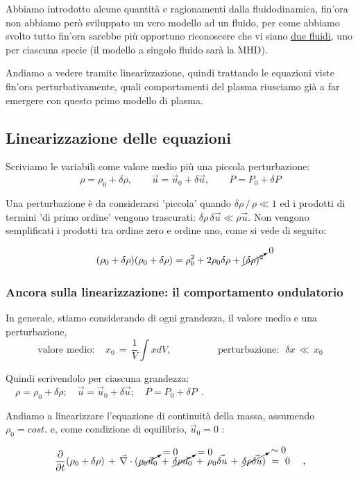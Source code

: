 Abbiamo introdotto alcune quantità e ragionamenti dalla fluidodinamica, fin'ora non abbiamo però sviluppato un vero modello ad un fluido, per come abbiamo svolto tutto fin'ora sarebbe più opportuno riconoscere che vi siano \underline{due fluidi}, uno per ciascuna specie (il modello a singolo fluido sarà la MHD).

Andiamo a vedere tramite linearizzazione, quindi trattando le equazioni viste fin'ora perturbativamente, quali comportamenti del plasma riusciamo già a far emergere con questo primo modello di plasma.

\subsection{Linearizzazione delle equazioni} 

Scriviamo le variabili come valore medio più una piccola perturbazione:
\[
\rho = \rho_0 + \delta\rho, \qquad 
\vec u = \vec u_0 + \delta \vec u, \qquad
P = P_0 + \delta P
\]

Una perturbazione è da considerarsi 'piccola' quando $\delta \rho \, / \,\rho \ll 1$ ed i prodotti di termini 'di primo ordine' vengono trascurati: $\delta \rho \, \delta \vec u \ll \rho \vec u$. 
Non vengono semplificati i prodotti tra ordine zero e ordine uno, come si vede di seguito:

\[
(\rho_0 + \delta \rho)(\rho_0 + \delta \rho) 
= \rho_0^2 + 2\rho_0 \delta \rho + \cancelto{0}{(\delta \rho)^2}
\]


\subsubsection{Ancora sulla linearizzazione: il comportamento ondulatorio} 

In generale, stiamo considerando di ogni grandezza, il valore medio e una perturbazione, \[ \text{valore medio:}\ \ \ \ \  x_0\, =\, \frac{1}{V}\int x dV,\hspace{2cm} \text{perturbazione:}\ \ \ \delta x\,\ll\, x_0\]

Quindi scrivendolo per ciascuna grandezza: $\quad \rho = \rho_0 + \delta \rho; \quad \vec u = \vec u_0 + \delta \vec u; \quad P = P_0 + \delta P\ \ .$

\vspace{0.4cm}

Andiamo a linearizzare l'equazione di continuità della massa, assumendo $\rho_0 = cost.$ e, come condizione di equilibrio, $\vec u_0 = 0$ :

\[\displaystyle \frac{\partial}{\partial t} (\rho_0 + \delta\rho)\, +\, \vec\nabla\cdot (\cancelto{=0}{\rho_0\vec u_0}\, +\, \cancelto{=0}{\delta\rho\vec{u_0}}\, +\, \rho_0\vec{\delta u}\, +\, \cancelto{\sim 0}{\delta \rho \vec{\delta u})}\ =\ 0 \ \ \ \ ,\]

